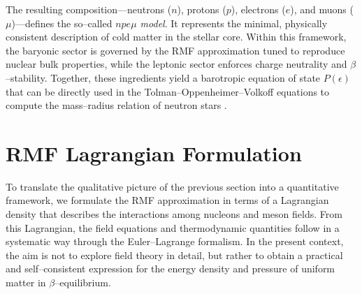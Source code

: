 The resulting composition—neutrons ($n$), protons ($p$), electrons ($e$), and
muons ($\mu$)—defines the so–called \emph{$npe\mu$ model}. It represents the
minimal, physically consistent description of cold matter in the
stellar core. Within this framework, the baryonic sector is governed by the
RMF approximation tuned to reproduce nuclear bulk properties,
while the leptonic sector enforces charge neutrality and $\beta$–stability.
Together, these ingredients yield a barotropic equation of state $P(\epsilon)$
that can be directly used in the Tolman–Oppenheimer–Volkoff equations to compute
the mass–radius relation of neutron stars \cite{glendenning2000,pogliano2017}.


\section{RMF Lagrangian Formulation}
\label{sec:rmf_lagrangian}

To translate the qualitative picture of the previous section into a quantitative
framework, we formulate the RMF approximation in terms of a
Lagrangian density that describes the interactions among nucleons and meson
fields. From this Lagrangian, the field equations and thermodynamic quantities
follow in a systematic way through the Euler–Lagrange formalism. In the present
context, the aim is not to explore field theory in detail, but rather to obtain
a practical and self–consistent expression for the energy density and pressure
of uniform matter in $\beta$–equilibrium.

